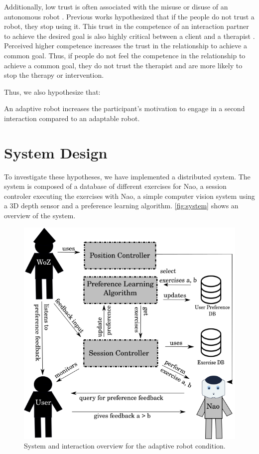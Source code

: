 Additionally, low trust is often associated with the misuse or disuse of an autonomous robot \textcite{beer2014toward}. Previous works hypothesized that if the people do not trust a robot, they stop using it.
This trust in the competence of an interaction partner to achieve the desired goal is also highly critical between a client and a therapist \cite{horvath1989development}. 
Perceived higher competence increases the trust in the relationship to achieve a common goal. 
Thus, if people do not feel the competence in the relationship to achieve a common goal, they do not trust the therapist and are more likely to stop the therapy or intervention. 

Thus, we also hypothesize that:

\begin{hypo}\label{hyp:adaptability:motivation}
 An adaptive robot increases the participant's motivation to engage in a second interaction compared to an adaptable robot.
\end{hypo}

\section{System Design} \label{adaptation:sec:system}

To investigate these hypotheses, we have implemented a distributed system. The system is composed of a database of different exercises for Nao, a session controler executing the exercises with Nao, a simple computer vision system using a 3D depth sensor and a preference learning algorithm. \autoref{fig:system} shows an overview of the system.


\begin{figure}[h!]
\includegraphics[width=\columnwidth]{figures/study.png}
\caption{System and interaction overview for the adaptive robot condition.} \label{fig:system}
\end{figure}


